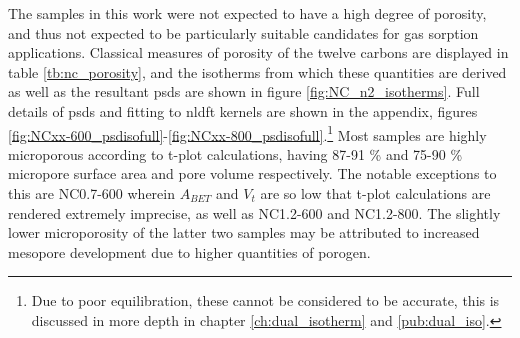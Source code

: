 The samples in this work were not expected to have a high degree of porosity, and thus not expected to be particularly suitable candidates for gas sorption applications. Classical measures of porosity of the twelve carbons are displayed in table \ref{tb:nc_porosity}, and the  isotherms from which these quantities are derived as well as the resultant \acrshort{psd}s are shown in figure \ref{fig:NC_n2_isotherms}. Full details of \acrshort{psd}s and fitting to \acrshort{nldft} kernels are shown in the appendix, figures \ref{fig:NCxx-600_psdisofull}-\ref{fig:NCxx-800_psdisofull}.\footnote{Due to poor equilibration, these  cannot be considered to be accurate, this is discussed in more depth in chapter \ref{ch:dual_isotherm} and \ref{pub:dual_iso}.} Most samples are highly microporous according to t-plot calculations, having 87-91 \% and 75-90 \% \gls{micropore} surface area and pore volume respectively. The notable exceptions to this are NC0.7-600 wherein $A_{BET}$ and $V_t$ are so low that t-plot calculations are rendered extremely imprecise, as well as NC1.2-600 and NC1.2-800. The slightly lower microporosity of the latter two samples may be attributed to increased \gls{mesopore} development due to higher quantities of \gls{porogen}. 

